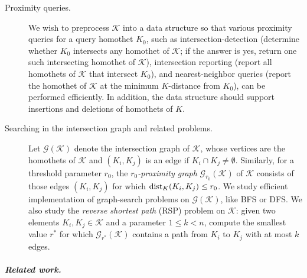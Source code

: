 \documentclass[11pt]{article}
\newif\ifsocgproc
\def\reals{{\mathbb R}}
\def\dist{{\rm dist}}
\def\G{\mathcal{G}}
\def\K{\mathcal{K}}
\theoremstyle{definition}
\begin{document}
\begin{description}
	\item[Proximity queries.] We wish to preprocess $\K$ into a data structure so that 
                various proximity queries for a query homothet $K_0$, such as intersection-detection 
		(determine whether $K_0$ intersects any homothet of $\K$; if the answer is yes, return 
                one such intersecting homothet of $\K$), 
		intersection reporting (report all homothets of $\K$ that intersect $K_0$),
		and nearest-neighbor queries (report the homothet of $\K$ at the 
		minimum $K$-distance from $K_0$),
		can be performed efficiently. In addition, the data structure should 
		support insertions and deletions of homothets of $K$.
	\item[Searching in the intersection graph and related problems.] Let $\G(\K)$ denote the intersection graph 
		of $\K$, whose vertices are the homothets of $\K$ and $(K_i,K_j)$ is an edge if 
		$K_i\cap K_j\ne\emptyset$. Similarly, for a threshold parameter $r_0$, the
                \emph{$r_0$-proximity graph} $\G_{r_0}(\K)$ of $\K$ consists of those edges $(K_i,K_j)$
                for which $\dist_K(K_i,K_j) \le r_0$.
		We study efficient implementation of graph-search problems on $\G(\K)$,
                like BFS or DFS.
		We also study the \emph{reverse shortest path} (RSP) problem on $\K$:
		given two elements $K_i,K_j \in \K$  and a parameter $1 \le k < n$, compute
		the smallest value $r^*$ for which $\G_{r^*}(\K)$
                contains a path from $K_i$ to $K_j$ with at most $k$ edges. 
\end{description}
%
%
\ifsocgproc 
\subparagraph*{Related work.}
\else
\end{document}
